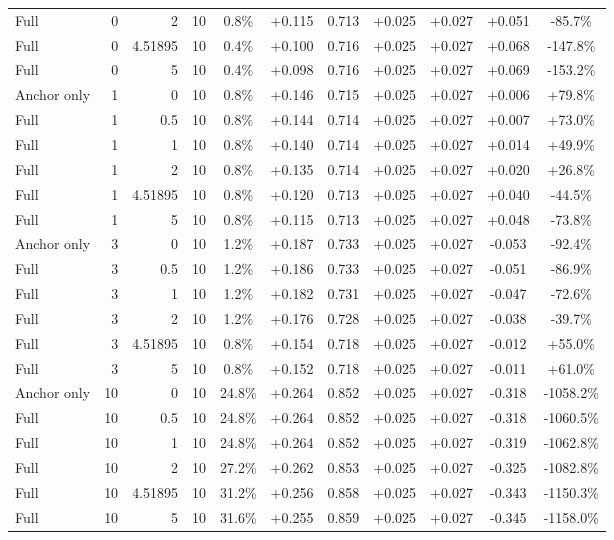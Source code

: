 \begin{table}[htbp]
\begin{tabular}{lrrrccccccc}
Full & 0 & 2 & 10 & 0.8\% & +0.115 & 0.713 & +0.025 & +0.027 & +0.051 & -85.7\% \\
Full & 0 & 4.51895 & 10 & 0.4\% & +0.100 & 0.716 & +0.025 & +0.027 & +0.068 & -147.8\% \\
Full & 0 & 5 & 10 & 0.4\% & +0.098 & 0.716 & +0.025 & +0.027 & +0.069 & -153.2\% \\
Anchor only & 1 & 0 & 10 & 0.8\% & +0.146 & 0.715 & +0.025 & +0.027 & +0.006 & +79.8\% \\
Full & 1 & 0.5 & 10 & 0.8\% & +0.144 & 0.714 & +0.025 & +0.027 & +0.007 & +73.0\% \\
Full & 1 & 1 & 10 & 0.8\% & +0.140 & 0.714 & +0.025 & +0.027 & +0.014 & +49.9\% \\
Full & 1 & 2 & 10 & 0.8\% & +0.135 & 0.714 & +0.025 & +0.027 & +0.020 & +26.8\% \\
Full & 1 & 4.51895 & 10 & 0.8\% & +0.120 & 0.713 & +0.025 & +0.027 & +0.040 & -44.5\% \\
Full & 1 & 5 & 10 & 0.8\% & +0.115 & 0.713 & +0.025 & +0.027 & +0.048 & -73.8\% \\
Anchor only & 3 & 0 & 10 & 1.2\% & +0.187 & 0.733 & +0.025 & +0.027 & -0.053 & -92.4\% \\
Full & 3 & 0.5 & 10 & 1.2\% & +0.186 & 0.733 & +0.025 & +0.027 & -0.051 & -86.9\% \\
Full & 3 & 1 & 10 & 1.2\% & +0.182 & 0.731 & +0.025 & +0.027 & -0.047 & -72.6\% \\
Full & 3 & 2 & 10 & 1.2\% & +0.176 & 0.728 & +0.025 & +0.027 & -0.038 & -39.7\% \\
Full & 3 & 4.51895 & 10 & 0.8\% & +0.154 & 0.718 & +0.025 & +0.027 & -0.012 & +55.0\% \\
Full & 3 & 5 & 10 & 0.8\% & +0.152 & 0.718 & +0.025 & +0.027 & -0.011 & +61.0\% \\
Anchor only & 10 & 0 & 10 & 24.8\% & +0.264 & 0.852 & +0.025 & +0.027 & -0.318 & -1058.2\% \\
Full & 10 & 0.5 & 10 & 24.8\% & +0.264 & 0.852 & +0.025 & +0.027 & -0.318 & -1060.5\% \\
Full & 10 & 1 & 10 & 24.8\% & +0.264 & 0.852 & +0.025 & +0.027 & -0.319 & -1062.8\% \\
Full & 10 & 2 & 10 & 27.2\% & +0.262 & 0.853 & +0.025 & +0.027 & -0.325 & -1082.8\% \\
Full & 10 & 4.51895 & 10 & 31.2\% & +0.256 & 0.858 & +0.025 & +0.027 & -0.343 & -1150.3\% \\
Full & 10 & 5 & 10 & 31.6\% & +0.255 & 0.859 & +0.025 & +0.027 & -0.345 & -1158.0\% \\

\end{tabular}
\end{table}
